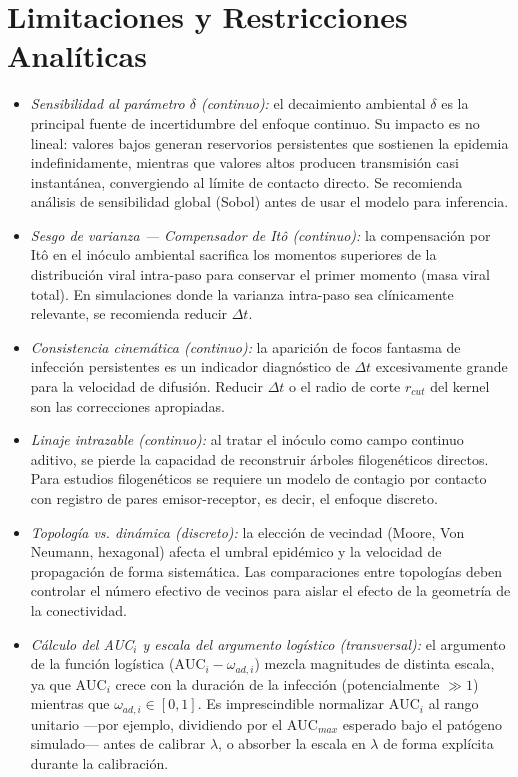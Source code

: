 \documentclass[conference]{IEEEtran}
\begin{document}
\section{Limitaciones y Restricciones Analíticas}
\begin{itemize}
    \item \textit{Sensibilidad al parámetro $\delta$ (continuo):} el decaimiento ambiental $\delta$ es la principal fuente de incertidumbre del enfoque continuo. Su impacto es no lineal: valores bajos generan reservorios persistentes que sostienen la epidemia indefinidamente, mientras que valores altos producen transmisión casi instantánea, convergiendo al límite de contacto directo. Se recomienda análisis de sensibilidad global (Sobol) antes de usar el modelo para inferencia.
    \item \textit{Sesgo de varianza --- Compensador de Itô (continuo):} la compensación por Itô en el inóculo ambiental sacrifica los momentos superiores de la distribución viral intra-paso para conservar el primer momento (masa viral total). En simulaciones donde la varianza intra-paso sea clínicamente relevante, se recomienda reducir $\Delta t$.
    \item \textit{Consistencia cinemática (continuo):} la aparición de focos fantasma de infección persistentes es un indicador diagnóstico de $\Delta t$ excesivamente grande para la velocidad de difusión. Reducir $\Delta t$ o el radio de corte $r_{cut}$ del kernel son las correcciones apropiadas.
    \item \textit{Linaje intrazable (continuo):} al tratar el inóculo como campo continuo aditivo, se pierde la capacidad de reconstruir árboles filogenéticos directos. Para estudios filogenéticos se requiere un modelo de contagio por contacto con registro de pares emisor-receptor, es decir, el enfoque discreto.
    \item \textit{Topología vs. dinámica (discreto):} la elección de vecindad (Moore, Von Neumann, hexagonal) afecta el umbral epidémico y la velocidad de propagación de forma sistemática. Las comparaciones entre topologías deben controlar el número efectivo de vecinos para aislar el efecto de la geometría de la conectividad.
    \item \textit{Cálculo del AUC$_i$ y escala del argumento logístico (transversal):} el argumento de la función logística ($\text{AUC}_i - \omega_{ad,i}$) mezcla magnitudes de distinta escala, ya que $\text{AUC}_i$ crece con la duración de la infección (potencialmente $\gg 1$) mientras que $\omega_{ad,i}\in[0,1]$. Es imprescindible normalizar $\text{AUC}_i$ al rango unitario ---por ejemplo, dividiendo por el $\text{AUC}_{max}$ esperado bajo el patógeno simulado--- antes de calibrar $\lambda$, o absorber la escala en $\lambda$ de forma explícita durante la calibración.
\end{itemize}
\end{document}
